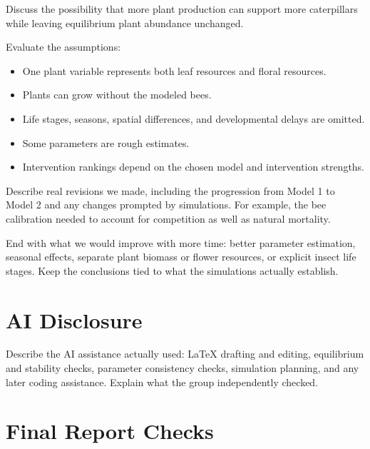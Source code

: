 \documentclass[11pt]{article}
\begin{document}
Discuss the possibility that more plant production can support more
caterpillars while leaving equilibrium plant abundance unchanged.

Evaluate the assumptions:
\begin{itemize}
    \item One plant variable represents both leaf resources and floral
    resources.
    \item Plants can grow without the modeled bees.
    \item Life stages, seasons, spatial differences, and developmental
    delays are omitted.
    \item Some parameters are rough estimates.
    \item Intervention rankings depend on the chosen model and
    intervention strengths.
\end{itemize}

Describe real revisions we made, including the progression from Model 1 to
Model 2 and any changes prompted by simulations. For example, the bee
calibration needed to account for competition as well as natural mortality.

End with what we would improve with more time: better parameter estimation,
seasonal effects, separate plant biomass or flower resources, or explicit
insect life stages. Keep the conclusions tied to what the simulations
actually establish.

\section{AI Disclosure}

Describe the AI assistance actually used: LaTeX drafting and editing,
equilibrium and stability checks, parameter consistency checks,
simulation planning, and any later coding assistance. Explain what the group
independently checked.

\section*{Final Report Checks}
\end{document}
